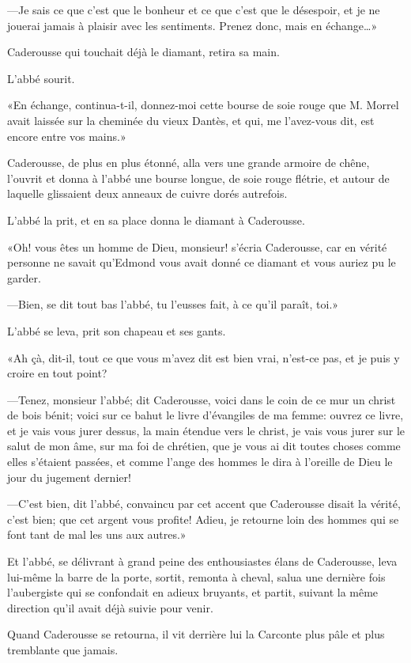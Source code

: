—Je sais ce que c'est que le bonheur et ce que c'est que le désespoir, et je ne jouerai jamais à plaisir avec les sentiments. Prenez donc, mais en échange\dots»

Caderousse qui touchait déjà le diamant, retira sa main.

L'abbé sourit.

«En échange, continua-t-il, donnez-moi cette bourse de soie rouge que M. Morrel avait laissée sur la cheminée du vieux Dantès, et qui, me l'avez-vous dit, est encore entre vos mains.»

Caderousse, de plus en plus étonné, alla vers une grande armoire de chêne, l'ouvrit et donna à l'abbé une bourse longue, de soie rouge flétrie, et autour de laquelle glissaient deux anneaux de cuivre dorés autrefois.

L'abbé la prit, et en sa place donna le diamant à Caderousse.

«Oh! vous êtes un homme de Dieu, monsieur! s'écria Caderousse, car en vérité personne ne savait qu'Edmond vous avait donné ce diamant et vous auriez pu le garder.

—Bien, se dit tout bas l'abbé, tu l'eusses fait, à ce qu'il paraît, toi.»

L'abbé se leva, prit son chapeau et ses gants.

«Ah çà, dit-il, tout ce que vous m'avez dit est bien vrai, n'est-ce pas, et je puis y croire en tout point?

—Tenez, monsieur l'abbé; dit Caderousse, voici dans le coin de ce mur un christ de bois bénit; voici sur ce bahut le livre d'évangiles de ma femme: ouvrez ce livre, et je vais vous jurer dessus, la main étendue vers le christ, je vais vous jurer sur le salut de mon âme, sur ma foi de chrétien, que je vous ai dit toutes choses comme elles s'étaient passées, et comme l'ange des hommes le dira à l'oreille de Dieu le jour du jugement dernier!

—C'est bien, dit l'abbé, convaincu par cet accent que Caderousse disait la vérité, c'est bien; que cet argent vous profite! Adieu, je retourne loin des hommes qui se font tant de mal les uns aux autres.»

Et l'abbé, se délivrant à grand peine des enthousiastes élans de Caderousse, leva lui-même la barre de la porte, sortit, remonta à cheval, salua une dernière fois l'aubergiste qui se confondait en adieux bruyants, et partit, suivant la même direction qu'il avait déjà suivie pour venir.

Quand Caderousse se retourna, il vit derrière lui la Carconte plus pâle et plus tremblante que jamais.

